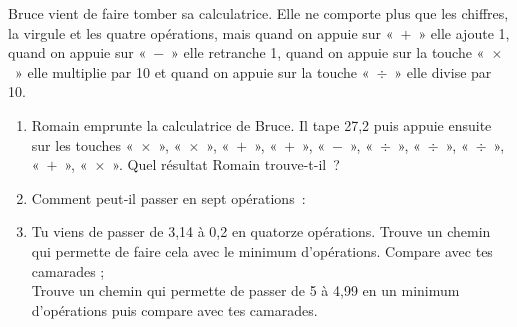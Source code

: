 \begin{enigme}
Bruce vient de faire tomber sa calculatrice. Elle ne comporte plus que les chiffres, la virgule et les quatre opérations, mais quand on appuie sur « $+$ » elle ajoute 1, quand on appuie sur « $-$ » elle retranche 1, quand on appuie sur la touche « $\times$ » elle multiplie par 10 et quand on appuie sur la touche « $\div$ » elle divise par 10. \\[-1em]
\begin{enumerate}
 \item Romain emprunte la calculatrice de Bruce. Il tape 27,2 puis appuie ensuite sur les touches « $\times$ », « $\times$ », « $+$ », « $+$ », « $-$ », « $\div$ », « $\div$ », « $\div$ », « $+$ », « $\times$ ». Quel résultat Romain trouve-t-il ?
 \item Comment peut‑il passer en sept opérations :    
 \item Tu viens de passer de 3,14 à 0,2 en quatorze opérations. Trouve un chemin qui permette de faire cela avec le minimum d'opérations. Compare avec tes camarades ; \\[0.5em]
Trouve un chemin qui permette de passer de 5 à 4,99 en un minimum d'opérations puis compare avec tes camarades.
 \end{enumerate}
\end{enigme} 
